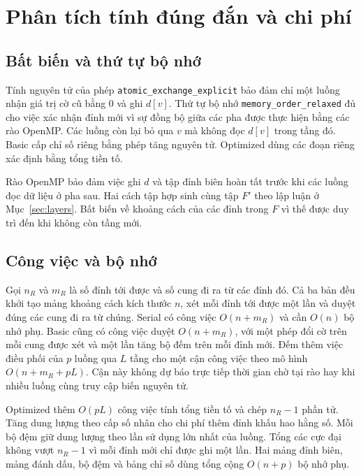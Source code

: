 \section{Phân tích tính đúng đắn và chi phí}
\subsection{Bất biến và thứ tự bộ nhớ}
Tính nguyên tử của phép \texttt{atomic\_exchange\_explicit} bảo đảm chỉ một luồng nhận giá trị cờ cũ bằng $0$ và ghi $d[v]$. Thứ tự bộ nhớ \texttt{memory\_order\_relaxed} đủ cho việc xác nhận đỉnh mới vì sự đồng bộ giữa các pha được thực hiện bằng các rào OpenMP. Các luồng còn lại bỏ qua $v$ mà không đọc $d[v]$ trong tầng đó. Basic cấp chỉ số riêng bằng phép tăng nguyên tử. Optimized dùng các đoạn riêng xác định bằng tổng tiền tố.

Rào OpenMP bảo đảm việc ghi $d$ và tập đỉnh biên hoàn tất trước khi các luồng đọc dữ liệu ở pha sau. Hai cách tập hợp sinh cùng tập $F'$ theo lập luận ở Mục~\ref{sec:layers}. Bất biến về khoảng cách của các đỉnh trong $F$ vì thế được duy trì đến khi không còn tầng mới.

\subsection{Công việc và bộ nhớ}
Gọi $n_R$ và $m_R$ là số đỉnh tới được và số cung đi ra từ các đỉnh đó. Cả ba bản đều khởi tạo mảng khoảng cách kích thước $n$, xét mỗi đỉnh tới được một lần và duyệt đúng các cung đi ra từ chúng. Serial có công việc $O(n+m_R)$ và cần $O(n)$ bộ nhớ phụ. Basic cũng có công việc duyệt $O(n+m_R)$, với một phép đổi cờ trên mỗi cung được xét và một lần tăng bộ đếm trên mỗi đỉnh mới. Đếm thêm việc điều phối của $p$ luồng qua $L$ tầng cho một cận công việc theo mô hình $O(n+m_R+pL)$. Cận này không dự báo trực tiếp thời gian chờ tại rào hay khi nhiều luồng cùng truy cập biến nguyên tử.

Optimized thêm $O(pL)$ công việc tính tổng tiền tố và chép $n_R-1$ phần tử. Tăng dung lượng theo cấp số nhân cho chi phí thêm đỉnh khấu hao hằng số. Mỗi bộ đệm giữ dung lượng theo lần sử dụng lớn nhất của luồng. Tổng các cực đại không vượt $n_R-1$ vì mỗi đỉnh mới chỉ được ghi một lần. Hai mảng đỉnh biên, mảng đánh dấu, bộ đệm và bảng chỉ số dùng tổng cộng $O(n+p)$ bộ nhớ phụ.


